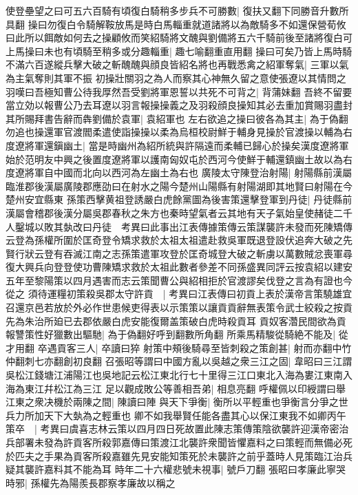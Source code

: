 使登壘望之曰可五六百騎有頃復白騎稍多步兵不可勝數|{
	復扶又翻下同勝音升數所具翻}
操曰勿復白令騎解鞍放馬是時白馬輜重就道諸將以為敵騎多不如還保營荀攸曰此所以餌敵如何去之操顧攸而笑紹騎將文醜與劉備將五六千騎前後至諸將復白可上馬操曰未也有頃騎至稍多或分趣輜重|{
	趣七喻翻重直用翻}
操曰可矣乃皆上馬時騎不滿六百遂縱兵擊大破之斬醜醜與顔良皆紹名將也再戰悉禽之紹軍奪氣|{
	三軍以氣為主氣奪則其軍不振}
初操壯關羽之為人而察其心神無久留之意使張遼以其情問之羽嘆曰吾極知曹公待我厚然吾受劉將軍恩誓以共死不可背之|{
	背蒲妹翻}
吾終不留要當立効以報曹公乃去耳遼以羽言報操操義之及羽殺顔良操知其必去重加賞賜羽盡封其所賜拜書告辭而犇劉備於袁軍|{
	袁紹軍也}
左右欲追之操曰彼各為其主|{
	為于偽翻}
勿追也操還軍官渡閻柔遣使詣操操以柔為烏桓校尉鮮于輔身見操於官渡操以輔為右度遼將軍還鎭幽土|{
	當是時幽州為紹所統與許隔遠而柔輔已歸心於操矣漢度遼將軍始於范明友中興之後置度遼將軍以護南匈奴屯於西河今使鮮于輔還鎮幽土故以為右度遼將軍自中國而北向以西河為左幽土為右也}
廣陵太守陳登治射陽|{
	射陽縣前漢屬臨淮郡後漢屬廣陵郡應劭曰在射水之陽今楚州山陽縣有射陽湖即其地賢曰射陽在今楚州安宜縣東}
孫策西擊黄祖登誘嚴白虎餘黨圖為後害策還擊登軍到丹徒|{
	丹徒縣前漢屬會稽郡後漢分屬吳郡春秋之朱方也秦時望氣者云其地有天子氣始皇使赭徒二千人鑿城以敗其埶改曰丹徒　考異曰此事出江表傳據策傳云策謀襲許未發而死陳矯傳云登為孫權所圍於匡奇登令矯求救於太祖太祖遣赴救吳軍既退登設伏追奔大破之先賢行狀云登有吞滅江南之志孫策遣軍攻登於匡奇城登大破之斬虜以萬數賊忿喪軍尋復大興兵向登登使功曹陳矯求救於太祖此數者參差不同孫盛異同評云按袁紹以建安五年至黎陽策以四月遇害而志云策聞曹公與紹相拒於官渡謬矣伐登之言為有證也今從之}
須待運糧初策殺吳郡太守許貢　|{
	考異曰江表傳曰初貢上表於漢帝言策驍雄宜召還京邑若放於外必作世患候吏得表以示策策以讓貢貢辭無表策令武士絞殺之按貢先為朱治所廹已去郡依嚴白虎安能復爾盖策破白虎時殺貢耳}
貢奴客濳民間欲為貢報讐策性好獵數出驅馳|{
	為于偽翻好呼到翻數所角翻}
所乘馬精駿從騎絶不能及|{
	從才用翻}
卒遇貢客三人|{
	卒讀曰猝}
射策中頰後騎尋至皆刺殺之策創甚|{
	射而亦翻中竹仲翻刺七亦翻創初良翻}
召張昭等謂曰中國方亂以吳越之衆三江之固|{
	韋昭曰三江謂吳松江錢塘江浦陽江也吳地記云松江東北行七十里得三江口東北入海為婁江東南入海為東江幷松江為三江}
足以觀成敗公等善相吾弟|{
	相息亮翻}
呼權佩以印綬謂曰舉江東之衆决機於兩陳之間|{
	陳讀曰陣}
與天下爭衡|{
	衡所以平輕重也爭衡言分爭之世兵力所加天下大埶為之輕重也}
卿不如我舉賢任能各盡其心以保江東我不如卿丙午策卒　|{
	考異曰虞喜志林云策以四月四日死故置此陳志策傳策陰欲襲許迎漢帝密治兵部署未發為許貢客所殺郭嘉傳曰策渡江北襲許衆聞皆懼嘉料之曰策輕而無備必死於匹夫之手果為貢客所殺嘉雖先見安能知策死於未襲許之前乎蓋時人見策臨江治兵疑其襲許嘉料其不能為耳}
時年二十六權悲號未視事|{
	號戶刀翻}
張昭曰孝廉此寧哭時邪|{
	孫權先為陽羨長郡察孝廉故以稱之}
